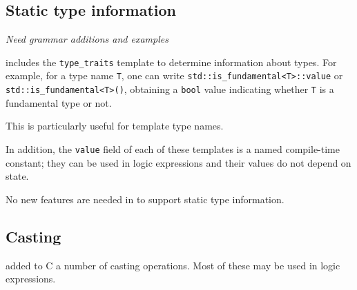 \subsection{Static type information}

\emph{Need grammar additions and examples}

\lang includes the \lstinline|type_traits| template to determine information about types.
For example, for a type name \lstinline|T|, one can write
\lstinline|std::is_fundamental<T>::value| or
\lstinline|std::is_fundamental<T>()|, obtaining a 
\lstinline|bool| value indicating whether 
\lstinline|T| is a fundamental type or not.

This is particularly useful for template type names.

In addition, the \lstinline|value| field of each of these templates is a named \lang compile-time constant; they can be used in logic expressions and their values do not depend on state.

No new features are needed in \NAME to support static type information. 


\subsection{Casting}
\label{sec:casts}




\lang added to C a number of casting operations. Most of these may be 
used in logic expressions.

